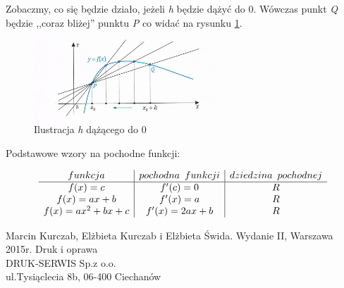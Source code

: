 \documentclass[12pt]{article}
\begin{document}
Zobaczmy, co się będzie działo, jeżeli \textit{h} będzie dążyć do 0. Wówczas punkt \textit{Q} będzie ,,coraz bliżej'' punktu \textit{P} co widać na rysunku \ref{rys2_model}. 
\begin{figure}[ht]
\begin{center}
\includegraphics[height=3cm]{zdj2.jpg}
\caption{Ilustracja \textit{h} dążącego do 0}
\label{rys2_model}
\end{center}
\end{figure}
\begin{center}
Podstawowe wzory na pochodne funkcji:
\end{center}

\[
\begin{array}{c|c|c}
funkcja & pochodna \hspace{5px} funkcji & dziedzina  \hspace{5px} pochodnej\\
\hline
f(x)=c & f'(c)= 0 & R \\
f(x) = ax + b & f'(x) = a & R\\
f(x) = ax^2 + bx + c & f'(x) = 2ax + b & R
\end{array}
\]
\newpage
\begin{thebibliography}{9}
Marcin Kurczab, Elżbieta Kurczab i Elżbieta Świda. Wydanie II, Warszawa 2015r.
Druk i oprawa\\
DRUK-SERWIS Sp.z o.o.\\
ul.Tysiąclecia 8b, 06-400 Ciechanów
\end{thebibliography}
\end{document}
